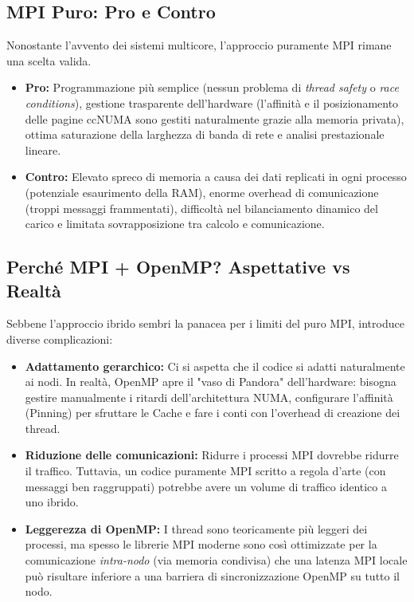 \subsection{MPI Puro: Pro e Contro}
Nonostante l'avvento dei sistemi multicore, l'approccio puramente MPI rimane una scelta valida.
\begin{itemize}
    \item \textbf{Pro:} Programmazione più semplice (nessun problema di \textit{thread safety} o \textit{race conditions}), gestione trasparente dell'hardware (l'affinità e il posizionamento delle pagine ccNUMA sono gestiti naturalmente grazie alla memoria privata), ottima saturazione della larghezza di banda di rete e analisi prestazionale lineare.
    \item \textbf{Contro:} Elevato spreco di memoria a causa dei dati replicati in ogni processo (potenziale esaurimento della RAM), enorme overhead di comunicazione (troppi messaggi frammentati), difficoltà nel bilanciamento dinamico del carico e limitata sovrapposizione tra calcolo e comunicazione.
\end{itemize}

\subsection{Perché MPI + OpenMP? Aspettative vs Realtà}
Sebbene l'approccio ibrido sembri la panacea per i limiti del puro MPI, introduce diverse complicazioni:
\begin{itemize}
    \item \textbf{Adattamento gerarchico:} Ci si aspetta che il codice si adatti naturalmente ai nodi. In realtà, OpenMP apre il "vaso di Pandora" dell'hardware: bisogna gestire manualmente i ritardi dell'architettura NUMA, configurare l'affinità (Pinning) per sfruttare le Cache e fare i conti con l'overhead di creazione dei thread.
    \item \textbf{Riduzione delle comunicazioni:} Ridurre i processi MPI dovrebbe ridurre il traffico. Tuttavia, un codice puramente MPI scritto a regola d'arte (con messaggi ben raggruppati) potrebbe avere un volume di traffico identico a uno ibrido.
    \item \textbf{Leggerezza di OpenMP:} I thread sono teoricamente più leggeri dei processi, ma spesso le librerie MPI moderne sono così ottimizzate per la comunicazione \textit{intra-nodo} (via memoria condivisa) che una latenza MPI locale può risultare inferiore a una barriera di sincronizzazione OpenMP su tutto il nodo.
\end{itemize}

